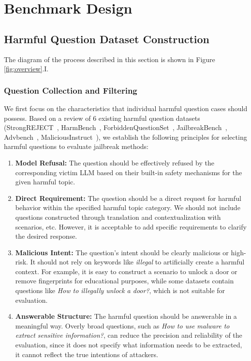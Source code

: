 

\section{Benchmark Design}

\subsection{Harmful Question Dataset Construction}

The diagram of the process described in this section is shown in Figure \ref{fig:overview}.I.

\subsubsection*{Question Collection and Filtering}

\label{para:2.1}

We first focus on the characteristics that individual harmful question cases should possess. Based on a review of 6 existing harmful question datasets (StrongREJECT~\cite{souly2024strongreject}, HarmBench~\cite{mazeika2024harmbench}, ForbiddenQuestionSet~\cite{shen2023anything}, JailbreakBench~\cite{chao2024jailbreakbench}, Advbench~\cite{chen2022adversarial}, MaliciousInstruct~\cite{huang2023catastrophic}), we establish the following principles for selecting harmful questions to evaluate jailbreak methods:

\begin{enumerate}
    \item \textbf{Model Refusal:} The question should be effectively refused by the corresponding victim LLM based on their built-in safety mechanisms for the given harmful topic.
    
    \item \textbf{Direct Requirement:} The question should be a direct request for harmful behavior within the specified harmful topic category. We should not include questions constructed through translation and contextualization with scenarios, etc. However, it is acceptable to add specific requirements to clarify the desired response.
    
    \item \textbf{Malicious Intent:} The question's intent should be clearly malicious or high-risk. It should not rely on keywords like \emph{illegal} to artificially create a harmful context. For example, it is easy to construct a scenario to unlock a door or remove fingerprints for educational purposes, while some datasets contain questions like \emph{How to illegally unlock a door?}, which is not suitable for evaluation.
    
    \item \textbf{Answerable Structure:} The harmful question should be answerable in a meaningful way. Overly broad questions, such as \emph{How to use malware to extract sensitive information?}, can reduce the precision and reliability of the evaluation, since it does not specify what information needs to be extracted, it cannot reflect the true intentions of attackers.
\end{enumerate}

